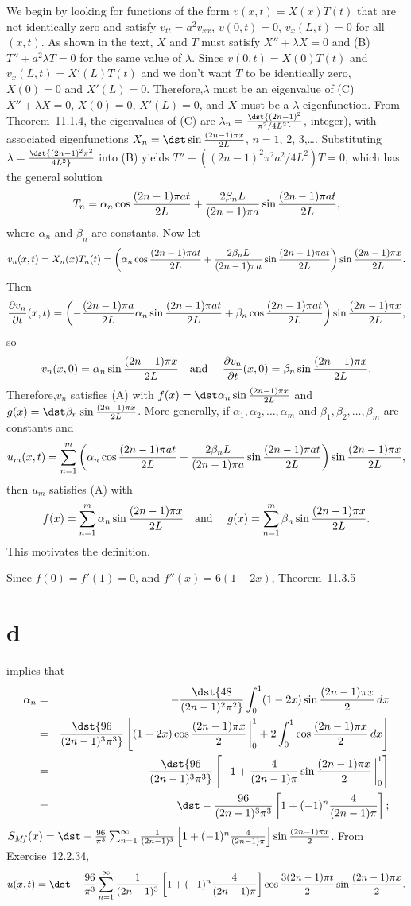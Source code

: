 \documentclass[dvips]{book}
\renewcommand{\exer}[1]{\par\medskip\;\noindent{\color{red}\bf #1.}}
\numberwithin{example}{section}
\numberwithin{equation}{section}
\numberwithin{theorem}{section}
\numberwithin{table}{section}
\numberwithin{figure}{section}
\newcommand{\lims}[2]{\,\bigg|_{#1}^{#2}}
\begin{document}
\exer{12.2.34}
 We begin by looking for functions of the form
$v(x,t)=X(x)T(t)$
that are not identically zero and satisfy
$v_{tt}=a^2v_{xx}$,
$v(0,t)=0$, $v_x(L,t)=0$
for all $(x,t)$. As shown in the text, $X$  and $T$
must satisfy
$X''+\lambda X=0$
and
(B) $T''+a^2\lambda T=0$
for the same value of $\lambda$.
Since $v(0,t)=X(0)T(t)$ and $v_x(L,t)=X'(L)T(t)$ and we don't want
$T$ to be  identically
zero,  $X(0)=0$ and $X'(L)=0$. Therefore,$\lambda$
must be an eigenvalue of
(C) $X''+\lambda X=0$, $X(0)=0$, $X'(L)=0$,
and $X$ must be a $\lambda$-eigenfunction.
 From Theorem~11.1.4, the eigenvalues of (C)
are $\lambda_n=\dst{(2n-1)^2\over\pi^2/4L^2}$,
integer), with associated eigenfunctions
$X_n=\dst\sin{(2n-1)\pi x\over2L}$, $n=1$, 2, 3,\dots.
Substituting $\lambda=\dst{(2n-1)^2\pi^2\over 4L^2}$  into
(B) yields
$T''+((2n-1)^2\pi^2a^2/4L^2)T=0$,
which has the general solution
$$
T_n=\alpha_n\cos{(2n-1)\pi at\over2L}+{2\beta_nL\over(2n-1)\pi a}\sin{
(2n-1)\pi at\over 2L},
$$
where $\alpha_n$  and $\beta_n$ are constants. Now let
$$
v_n(x,t)=X_n(x)T_n(t)=\left(\alpha_n\cos{(2n-1)\pi at\over2L}+
{2\beta_nL\over (2n-1)\pi a}\sin{(2n-1)\pi at\over2L}\right)
\sin{(2n-1)\pi x\over2L}.
$$
Then
$$
{\partial v_n\over\partial t}(x,t)=
\left(-{(2n-1)\pi a \over2L}\alpha_n\sin{(2n-1)\pi at\over2L}
+\beta_n\cos{(2n-1)\pi at\over2L}\right)\sin{(2n-1)\pi x\over2L},
$$
so
$$
v_n(x,0)=\alpha_n\sin{(2n-1)\pi x\over2L}
\mbox{\quad and \quad}
{\partial v_n\over\partial t}(x,0)=\beta_n
\sin{(2n-1)\pi x\over2L}.
$$
Therefore,$v_n$ satisfies (A) with
$f(x)=\dst\alpha_n \sin{(2n-1)\pi x\over 2L}$ and
$g(x)=\dst\beta_n\sin
{(2n-1)\pi x\over 2L}$. More generally, if
$\alpha_1,\alpha_2,\dots,\alpha_m$
and $\beta_1,\beta_2,\dots,\beta_m$ are constants and
$$
u_m(x,t)=\sum_{n=1}^m\left(\alpha_n\cos{(2n-1)\pi at\over
2L}+{2\beta_nL\over (2n-1)\pi a}\sin{(2n-1)\pi at\over2L}\right)
\sin{(2n-1)\pi x\over2L},
$$
then $u_m$ satisfies (A) with
$$
f(x)=\sum_{n=1}^m \alpha_n\sin{(2n-1)\pi x\over2L}
\mbox{\quad and \quad}
g(x)=\sum_{n=1}^m \beta_n\sin{(2n-1)\pi x\over2L}.
$$
 This motivates the definition.

\exer{12.2.36}
Since $f(0)=f'(1)=0$, and $f''(x)=6(1-2x)$,
Theorem~11.3.5\part{d} implies that
\begin{eqnarray*}
\alpha_n&=&-\dst{48\over(2n-1)^2\pi^2}\int_0^1(1-2x)
\sin{(2n-1)\pi x\over2}\,dx\\
&=&\dst{96\over(2n-1)^3\pi^3}\left[(1-2x)\cos{(2n-1)\pi
x\over2}\lims01+2\int_0^1\cos{(2n-1)\pi x\over2}\,dx\right]\\
&=&\dst{96\over(2n-1)^3\pi^3}\left[-1+{4\over(2n-1)\pi}
\sin{(2n-1)\pi x\over2}\lims01\right]\\
&=&\dst-{96\over(2n-1)^3\pi^3}\left[1+(-1)^n{4\over(2n-1)\pi}\right];
\end{eqnarray*}
$S_{M\!f}(x)
=\dst-{96\over\pi^3}\sum_{n=1}^\infty
{1\over(2n-1)^3}\left[1+(-1)^n{4\over(2n-1)\pi}\right]\sin{(2n-1)\pi x
\over2}$.
From Exercise~12.2.34,
$$
u(x,t)
=\dst-{96\over\pi^3}\sum_{n=1}^\infty
{1\over(2n-1)^3}\left[1+(-1)^n{4\over(2n-1)\pi}\right]
\cos{3(2n-1)\pi t\over2}\sin{(2n-1)\pi x\over2}.
$$
\end{document}

